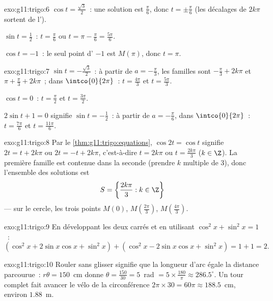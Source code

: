 \begin{solution}{exo:g11:trigo:6}
$\cos t = \frac{\sqrt3}{2}$~: une solution est $\frac\pi6$, donc
$t = \pm\frac\pi6$ (les décalages de $2k\pi$ sortent de l').

$\sin t = \frac12$~: $t = \frac\pi6$ ou $t = \pi - \frac\pi6 =
\frac{5\pi}{6}$.

$\cos t = -1$~: le seul point d' $-1$ est $M(\pi)$, donc
$t = \pi$.
\end{solution}

\begin{solution}{exo:g11:trigo:7}
$\sin t = -\frac{\sqrt3}{2}$~: à partir de $a = -\frac\pi3$, les familles
sont $-\frac\pi3 + 2k\pi$ et $\pi + \frac\pi3 + 2k\pi$~; dans
$\intco{0}{2\pi}$~: $t = \frac{4\pi}{3}$ et $t = \frac{5\pi}{3}$.

$\cos t = 0$~: $t = \frac\pi2$ et $t = \frac{3\pi}{2}$.

$2\sin t + 1 = 0$ signifie $\sin t = -\frac12$~: à partir de
$a = -\frac\pi6$, dans $\intco{0}{2\pi}$~: $t = \frac{7\pi}{6}$ et
$t = \frac{11\pi}{6}$.
\end{solution}

\begin{solution}{exo:g11:trigo:8}
Par le \cref{thm:g11:trigo:equations}, $\cos 2t = \cos t$ signifie
$2t = t + 2k\pi$ ou $2t = -t + 2k\pi$, c'est-à-dire $t = 2k\pi$ ou
$t = \frac{2k\pi}{3}$ ($k \in \Z$). La première famille est contenue dans
la seconde (prendre $k$ multiple de $3$), donc l'ensemble des solutions
est
\[
S = \left\{\frac{2k\pi}{3} : k \in \Z\right\}
\]
--- sur le cercle, les trois points $M(0)$,
$M\!\left(\frac{2\pi}{3}\right)$, $M\!\left(\frac{4\pi}{3}\right)$.
\end{solution}

\begin{solution}{exo:g11:trigo:9}
En développant les deux carrés et en utilisant
$\cos^2 x + \sin^2 x = 1$~:
\[
(\cos^2 x + 2\sin x\cos x + \sin^2 x)
+ (\cos^2 x - 2\sin x\cos x + \sin^2 x)
= 1 + 1 = 2 .
\]
\end{solution}

\begin{solution}{exo:g11:trigo:10}
Rouler sans glisser signifie que la longueur d'arc égale la distance
parcourue~: $r\theta = 150$~cm donne
$\theta = \frac{150}{30} = 5$~rad $= 5 \times \frac{180}{\pi} \approx
286.5^\circ$. Un tour complet fait avancer le vélo de la circonférence
$2\pi \times 30 = 60\pi \approx 188.5$~cm, environ $1.88$~m.
\end{solution}

